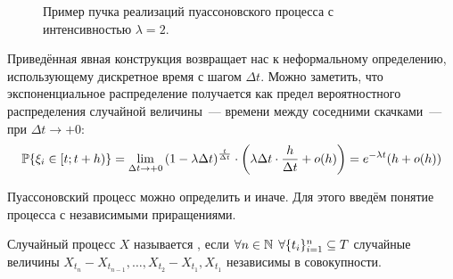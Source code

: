 \begin{figure}[ht!]
    \centering
    \caption{Пример пучка реализаций пуассоновского процесса с интенсивностью $ \lambda = 2 $.}
    \label{figure:special:Poisson_proccess_realizations}
\end{figure}


Приведённая явная конструкция возвращает нас к неформальному определению,
использующему дискретное время с шагом $ \Delta t $.
Можно заметить, что экспоненциальное распределение получается как
предел вероятностного распределения случайной величины~---
времени между соседними скачками~--- при $ \Delta t \to +0 $:
\[
    \mathbb{P} \{ \xi_i \in [t; t+h) \} = \lim_{\Delta t \to +0} \left( 1 - \lambda \Delta t \right)^{\frac{t}{\Delta t}} \cdot \left( \lambda \Delta t \cdot \frac{h}{\Delta t} + o(h) \right) =
    e^{-\lambda t} (h + o(h))
\]

Пуассоновский процесс можно определить и иначе.
Для этого введём понятие процесса с независимыми приращениями.

\begin{definition}
    \label{definition:special:independent_deltas}
    Случайный процесс $ X $ называется ,
    если $ \forall n \in \mathbb{N} \;\, \forall \{t_i\}_{i=1}^n \subseteq T $ случайные величины
    $ X_{t_n} - X_{t_{n-1}}, \ldots, X_{t_2} - X_{t_1}, X_{t_1} $
    независимы в совокупности.
\end{definition}

